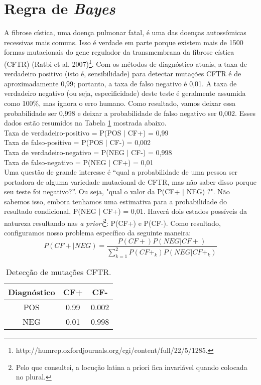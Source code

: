 \documentclass{article}[twocolumn]
\begin{document}
	\section{Regra de \textit{Bayes}}
	A fibrose cística, uma doença pulmonar fatal, é uma das doenças autossômicas recessivas mais
	comuns. Isso é verdade em parte porque existem mais de 1500 formas mutacionais do gene
	regulador da transmembrana da fibrose cística (CFTR) (Ratbi et al.
	2007)\footnote{http://humrep.oxfordjournals.org/cgi/content/full/22/5/1285.}. Com os métodos
	de diagnóstico atuais, a taxa de verdadeiro positivo (isto é, sensibilidade) para detectar
	mutações CFTR é de aproximadamente 0,99; portanto, a taxa de falso negativo é 0,01.
	A taxa de verdadeiro negativo (ou seja, especificidade) deste teste é geralmente assumida
	como 100\%, mas ignora o erro humano. Como resultado, vamos deixar essa probabilidade ser
	0,998 e deixar a probabilidade de falso negativo ser 0,002. Esses dados estão resumidos na
	Tabela \ref{tab:diagnostic} mostrada abaixo.\\
	Taxa de verdadeiro-positivo = P(POS $|$ CF+) = 0,99\\
	Taxa de falso-positivo = P(POS $|$ CF-) = 0,002\\
	Taxa de verdadeiro-negativo = P(NEG $|$ CF-) = 0,998\\
	Taxa de falso-negativo = P(NEG $|$ CF+) = 0,01\\
	Uma questão de grande interesse é “qual a probabilidade de uma pessoa ser portadora de alguma
	variedade  mutacional  de  CFTR,  mas  não  saber  disso  porque  seu  teste  foi negativo?”.
	Ou  seja,  "qual  o  valor  da P(CF+  $|$  NEG)  ?".  Não  sabemos  isso,  embora tenhamos uma
	estimativa para a probabilidade do resultado condicional, P(NEG $|$ CF+) = 0,01. Haverá dois
	estados possíveis da natureza resultando nas \textit{a priori}\footnote{Pelo que consultei,
	a locução latina a priori fica invariável quando colocada no plural.}: P(CF+) e P(CF-).
	Como resultado, configuramos nosso problema específico da seguinte maneira:
	\begin{equation}
		P(CF+|NEG) = \frac{P(CF+)P(NEG|CF+)}{\sum_{k=1}^{2}P(CF+_{k})P(NEG|CF+_{k})}
	\end{equation}
	\begin{table}[H]
		\centering
		\begin{tabular}{ccc}
			\hline
			Diagnóstico & CF+ & CF-\\
			\hline
			POS & 0.99 & 0.002\\
			NEG & 0.01 & 0.998\\
			\hline
		\end{tabular}
		\caption{Detecção de mutações CFTR.}
		\label{tab:diagnostic}
	\end{table}
\end{document}
